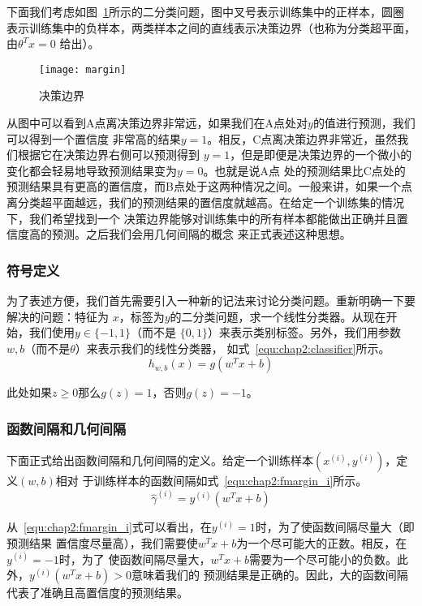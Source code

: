 下面我们考虑如图~\ref{fig:margin}所示的二分类问题，图中叉号表示训练集中的正样本，圆圈
表示训练集中的负样本，两类样本之间的直线表示决策边界（也称为分类超平面，由$\theta^Tx = 0$
给出）。
\begin{figure}[ht] %
  \centering
  \texttt{[image: margin]}
  \caption{决策边界}
  \label{fig:margin}
\end{figure}

从图中可以看到A点离决策边界非常远，如果我们在A点处对$y$的值进行预测，我们可以得到一个置信度
非常高的结果$y = 1$。相反，C点离决策边界非常近，虽然我们根据它在决策边界右侧可以预测得到
$y = 1$，但是即便是决策边界的一个微小的变化都会轻易地导致预测结果变为$y = 0$。也就是说A点
处的预测结果比C点处的预测结果具有更高的置信度，而B点处于这两种情况之间。一般来讲，如果一个点
离分类超平面越远，我们的预测结果的置信度就越高。在给定一个训练集的情况下，我们希望找到一个
决策边界能够对训练集中的所有样本都能做出正确并且置信度高的预测。之后我们会用几何间隔的概念
来正式表述这种思想。

\subsubsection{符号定义}

为了表述方便，我们首先需要引入一种新的记法来讨论分类问题。重新明确一下要解决的问题：特征为
$x$，标签为$y$的二分类问题，求一个线性分类器。从现在开始，我们使用$y \in \{-1, 1\}$（而不是
$\{0, 1\}$）来表示类别标签。另外，我们用参数$w, b$（而不是$\theta$）来表示我们的线性分类器，
如式~\ref{equ:chap2:classifier}所示。
\begin{equation}
  \label{equ:chap2:classifier}
  h_{w,b}(x) = g(w^Tx+b)
\end{equation}

此处如果$z \geq 0$那么$g(z) = 1$，否则$g(z) = -1$。

\subsubsection{函数间隔和几何间隔}

下面正式给出函数间隔和几何间隔的定义。给定一个训练样本$(x^{(i)},y^{(i)})$，定义$(w,b)$相对
于训练样本的函数间隔如式~\ref{equ:chap2:fmargin_i}所示。
\begin{equation}
  \label{equ:chap2:fmargin_i}
  \hat{\gamma}^{(i)} = y^{(i)}(w^Tx+b)
\end{equation}

从~\ref{equ:chap2:fmargin_i}式可以看出，在$y^{(i)} = 1$时，为了使函数间隔尽量大（即预测结果
置信度尽量高），我们需要使$w^Tx+b$为一个尽可能大的正数。相反，在$y^{(i)} = -1$时，为了
使函数间隔尽量大，$w^Tx+b$需要为一个尽可能小的负数。此外，$y^{(i)}(w^Tx+b) > 0$意味着我们的
预测结果是正确的。因此，大的函数间隔代表了准确且高置信度的预测结果。

